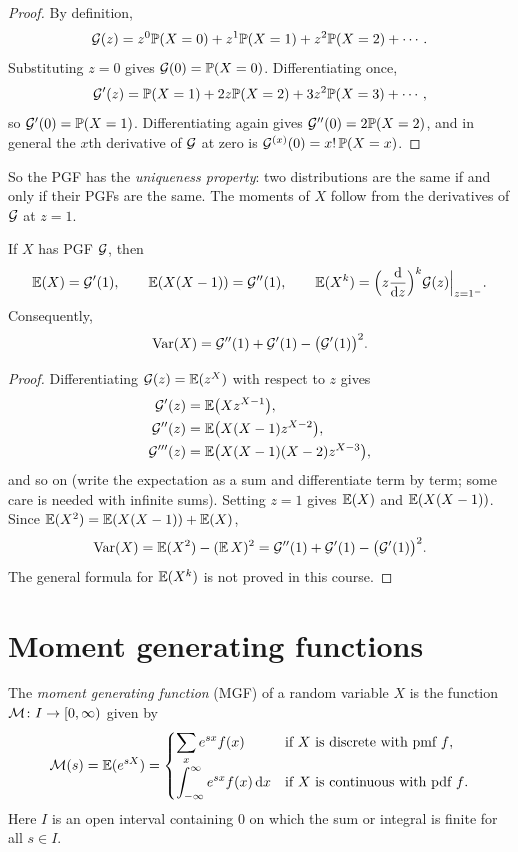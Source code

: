 \begin{proof}
By definition,
\[
  \mathcal{G}(z) = z^0 \mathbb{P}(X = 0) + z^1 \mathbb{P}(X = 1) + z^2 \mathbb{P}(X = 2) + \cdots.
\]
Substituting $z = 0$ gives $\mathcal{G}(0) = \mathbb{P}(X = 0)$. Differentiating once,
\[
  \mathcal{G}'(z) = \mathbb{P}(X = 1) + 2z \mathbb{P}(X = 2) + 3z^2 \mathbb{P}(X = 3) + \cdots,
\]
so $\mathcal{G}'(0) = \mathbb{P}(X = 1)$. Differentiating again gives $\mathcal{G}''(0) = 2 \mathbb{P}(X = 2)$, and in general the $x$th derivative of $\mathcal{G}$ at zero is $\mathcal{G} ^{(x)}(0) = x! \, \mathbb{P}(X = x)$.
\end{proof}

So the PGF has the \emph{uniqueness property}: two distributions are the same if and only if their PGFs are the same. The moments of $X$ follow from the derivatives of $\mathcal{G}$ at $z = 1$.

\begin{theorem}\label{thm:pgf-moments}
If $X$ has PGF $\mathcal{G}$, then
\[
  \operatorname{\mathbb{E}}(X) = \mathcal{G}'(1), \qquad \operatorname{\mathbb{E}}(X(X-1)) = \mathcal{G}''(1), \qquad \operatorname{\mathbb{E}}(X^k) = \Bigl(z \frac{\mathop{}\!\mathrm{d}}{\mathop{}\!\mathrm{d} z}\Bigr)^k \mathcal{G}(z) \Big|_{z = 1^-}.
\]
Consequently,
\[
  \operatorname{Var}(X) = \mathcal{G}''(1) + \mathcal{G}'(1) - \bigl(\mathcal{G}'(1)\bigr)^2.
\]
\end{theorem}

\begin{proof}
Differentiating $\mathcal{G}(z) = \operatorname{\mathbb{E}}(z^X)$ with respect to $z$ gives
\begin{align*}
  \mathcal{G}'(z) &= \operatorname{\mathbb{E}}\bigl(X z^{X-1}\bigr), \\
  \mathcal{G}''(z) &= \operatorname{\mathbb{E}}\bigl(X(X-1) z^{X-2}\bigr), \\
  \mathcal{G}'''(z) &= \operatorname{\mathbb{E}}\bigl(X(X-1)(X-2) z^{X-3}\bigr),
\end{align*}
and so on (write the expectation as a sum and differentiate term by term; some care is needed with infinite sums). Setting $z = 1$ gives $\operatorname{\mathbb{E}}(X)$ and $\operatorname{\mathbb{E}}(X(X-1))$. Since $\operatorname{\mathbb{E}}(X^2) = \operatorname{\mathbb{E}}(X(X-1)) + \operatorname{\mathbb{E}}(X)$,
\[
  \operatorname{Var}(X) = \operatorname{\mathbb{E}}(X^2) - (\operatorname{\mathbb{E}} X)^2 = \mathcal{G}''(1) + \mathcal{G}'(1) - \bigl(\mathcal{G}'(1)\bigr)^2.
\]
The general formula for $\operatorname{\mathbb{E}}(X^k)$ is not proved in this course.
\end{proof}

\section{Moment generating functions}\label{sec:mgf}

\begin{definition}\label{def:mgf}
The \emph{moment generating function} (MGF) of a random variable $X$ is the function $\mathcal{M}  \colon I \to [0, \infty)$ given by
\[
  \mathcal{M}(s) = \operatorname{\mathbb{E}}(e^{sX}) = \begin{cases}
    \displaystyle \sum_x e^{sx} f(x) & \text{if $X$ is discrete with pmf $f$}, \\[10pt]
    \displaystyle \int_{-\infty}^\infty e^{sx} f(x) \mathop{}\!\mathrm{d} x & \text{if $X$ is continuous with pdf $f$}.
  \end{cases}
\]
Here $I$ is an open interval containing $0$ on which the sum or integral is finite for all $s \in I$.
\end{definition}

